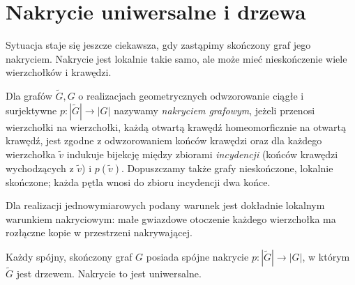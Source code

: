 \begin{center}
\end{center}

\section{Nakrycie uniwersalne i drzewa}
\label{sec:tg-universal-cover}

Sytuacja staje się jeszcze ciekawsza, gdy zastąpimy skończony graf
jego nakryciem. Nakrycie jest lokalnie takie samo, ale może mieć
nieskończenie wiele wierzchołków i krawędzi.

\begin{definicja}
Dla grafów $\widetilde G,G$ o realizacjach geometrycznych
odwzorowanie ciągłe i surjektywne
$p:|\widetilde G|\to|G|$ nazywamy
\emph{nakryciem grafowym}, jeżeli przenosi wierzchołki na
wierzchołki, każdą otwartą krawędź homeomorficznie na
otwartą krawędź, jest zgodne z odwzorowaniem końców
krawędzi oraz dla każdego wierzchołka
$\widetilde v$ indukuje bijekcję między zbiorami
\emph{incydencji} (końców krawędzi wychodzących z
$\widetilde v$) i $p(\widetilde v)$.
Dopuszczamy także grafy nieskończone, lokalnie skończone;
każda pętla wnosi do zbioru incydencji dwa końce.
\end{definicja}

Dla realizacji jednowymiarowych podany warunek jest dokładnie
lokalnym warunkiem nakryciowym: małe gwiazdowe otoczenie
każdego wierzchołka ma rozłączne kopie w przestrzeni nakrywającej.

\begin{twierdzenie}
\label{thm:tg-universal}
Każdy spójny, skończony graf $G$ posiada spójne nakrycie
$p:|\widetilde G|\to|G|$, w którym $\widetilde G$ jest drzewem.
Nakrycie to jest uniwersalne.
\end{twierdzenie}

